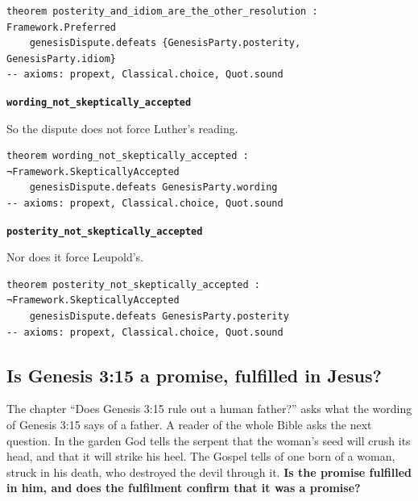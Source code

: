 \documentclass[11pt]{article}
\begin{document}
{\small\begin{verbatim}
theorem posterity_and_idiom_are_the_other_resolution : Framework.Preferred
    genesisDispute.defeats {GenesisParty.posterity, GenesisParty.idiom}
-- axioms: propext, Classical.choice, Quot.sound
\end{verbatim}}
\par\medskip\noindent\textbf{\texttt{wording\_\allowbreak{}not\_\allowbreak{}skeptically\_\allowbreak{}accepted}}\par\nobreak\noindent
So the dispute does not force Luther’s reading.

{\small\begin{verbatim}
theorem wording_not_skeptically_accepted : ¬Framework.SkepticallyAccepted
    genesisDispute.defeats GenesisParty.wording
-- axioms: propext, Classical.choice, Quot.sound
\end{verbatim}}
\par\medskip\noindent\textbf{\texttt{posterity\_\allowbreak{}not\_\allowbreak{}skeptically\_\allowbreak{}accepted}}\par\nobreak\noindent
Nor does it force Leupold’s.

{\small\begin{verbatim}
theorem posterity_not_skeptically_accepted : ¬Framework.SkepticallyAccepted
    genesisDispute.defeats GenesisParty.posterity
-- axioms: propext, Classical.choice, Quot.sound
\end{verbatim}}
\subsection*{Is Genesis 3:15 a promise, fulfilled in Jesus?}
The chapter “Does Genesis 3:15 rule out a human father?” asks what the wording of Genesis 3:15 says of a father. A reader of the whole Bible asks the next question. In the garden God tells the serpent that the woman’s seed will crush its head, and that it will strike his heel. The Gospel tells of one born of a woman, struck in his death, who destroyed the devil through it. \textbf{Is the promise fulfilled in him, and does the fulfilment confirm that it was a promise?}
\end{document}
